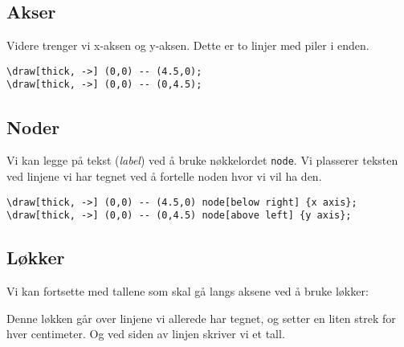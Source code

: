 \documentclass[11pt, a4paper]{article}
\begin{document}
\subsection{Akser}
\noindent Videre trenger vi x-aksen og y-aksen. Dette er to linjer med piler i enden.

\begin{center}
\scalebox{0.8}{
\begin{tikzpicture}
    \draw[step=1cm,gray!80,very thin] (-1.9,-1.9) grid (5.9,5.9);
    \draw[thick, ->] (0,0) -- (4.5,0);
    \draw[thick, ->] (0,0) -- (0,4.5);
\end{tikzpicture}
}
\end{center}

\begin{Verbatim}[fontsize=\small]
\draw[thick, ->] (0,0) -- (4.5,0);
\draw[thick, ->] (0,0) -- (0,4.5);
\end{Verbatim}

\newpage

\subsection{Noder}
Vi kan legge på tekst (\textit{label}) ved å bruke nøkkelordet \texttt{node}. Vi plasserer teksten ved linjene vi har tegnet ved å fortelle noden hvor vi vil ha den.

\begin{center}
\end{center}

\begin{Verbatim}[fontsize=\small]
\draw[thick, ->] (0,0) -- (4.5,0) node[below right] {x axis};
\draw[thick, ->] (0,0) -- (0,4.5) node[above left] {y axis};
\end{Verbatim}

\subsection{Løkker}
\noindent Vi kan fortsette med tallene som skal gå langs aksene ved å bruke løkker:
\begin{center}
\end{center}
Denne løkken går over linjene vi allerede har tegnet, og setter en liten strek for hver centimeter. Og ved siden av linjen skriver vi et tall.
\end{document}
